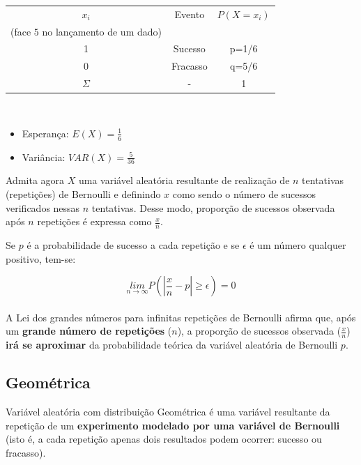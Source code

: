 \documentclass[
]{book}
\providecommand{\tightlist}{%
  \setlength{\itemsep}{0pt}\setlength{\parskip}{0pt}}
\begin{document}
\hfill\break

\begin{table}[h]
\centering
\begin{tabular}{|c|c|c|}
\hline 
$x_{i}$ & Evento & $P(X=x_{i})$ \\ 
(face $5$ no lançamento de um dado) &  &  \\ 
\hline 
1 & Sucesso & p=1/6 \\ 
\hline 
0 & Fracasso & q=5/6 \\ 
\hline 
$\Sigma$ & - & 1 \\ 
\hline 
\end{tabular} 
\end{table}

~

\begin{itemize}
\tightlist
\item
  Esperança: \(E(X)= \frac{1}{6}\)\\
\item
  Variância: \(VAR(X)= \frac{5}{36}\)
\end{itemize}

\hfill\break

Admita agora \(X\) uma variável aleatória resultante de realização de \(n\) tentativas (repetições) de Bernoulli e definindo \(x\) como sendo o número de sucessos verificados nessas \(n\) tentativas. Desse modo, proporção de sucessos observada após \(n\) repetições é expressa como \(\frac{x}{n}\).

\hfill\break

Se \(p\) é a probabilidade de sucesso a cada repetição e se \(\epsilon\) é um número qualquer positivo, tem-se:

\hfill\break

\[
\underset{n\to \infty }{lim}P\left(\left|\frac{x}{n}-p\right|\ge \epsilon \right)=0
\]\\

A Lei dos grandes números para infinitas repetições de Bernoulli afirma que, após um \textbf{grande número de repetições} (\(n\)), a proporção de sucessos observada (\(\frac{x}{n}\)) \textbf{irá se aproximar} da probabilidade teórica da variável aleatória de Bernoulli \(p\).

\hypertarget{geomuxe9trica}{%
\subsection{Geométrica}\label{geomuxe9trica}}

Variável aleatória com distribuição Geométrica é uma variável resultante da repetição de um \textbf{experimento modelado por uma variável de Bernoulli} (isto é, a cada repetição apenas dois resultados podem ocorrer: sucesso ou fracasso).
\end{document}
